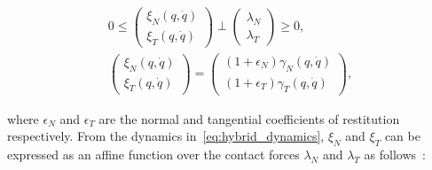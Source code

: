 \begin{equation}
  \begin{gathered}
    0 \leq 
    \begin{pmatrix}
      \xi_N(q, \dot{q}) \\
      \xi_T(q, \dot{q})
    \end{pmatrix} 
    \perp
      \begin{pmatrix}
        \lambda_N  \\
        \lambda_T
      \end{pmatrix} \geq 0, \\
    \begin{pmatrix}
      \xi_N(q, \dot{q}) \\
      \xi_T(q, \dot{q})
    \end{pmatrix} =
      \begin{pmatrix}
        (1+\epsilon_N) \gamma_N(q, \dot{q})  \\
        (1+\epsilon_T) \gamma_T(q, \dot{q})
      \end{pmatrix},
  \end{gathered}
  \label{eq:complementarity} 
\end{equation}

\noindent where $\epsilon_N$ and $\epsilon_T$ are the normal and tangential
coefficients of restitution respectively. 
% 
From the dynamics in~\eqref{eq:hybrid_dynamics}, $\xi_N$ and $\xi_T$ can be
expressed as an affine function over the contact forces $\lambda_N$ and
$\lambda_T$ as follows~\cite{glocker2005formulation}:

